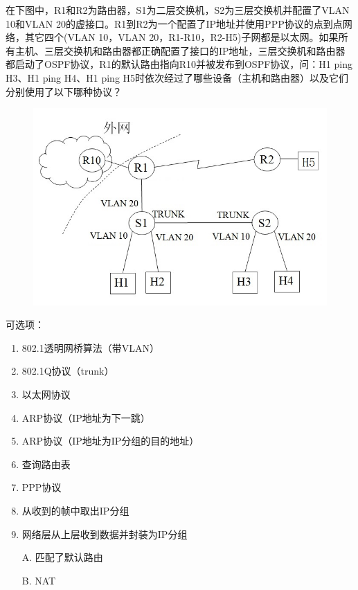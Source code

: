 \begin{example}[综合题]
	在下图中，R1和R2为路由器，S1为二层交换机，S2为三层交换机并配置了VLAN 10和VLAN 20的虚接口。R1到R2为一个配置了IP地址并使用PPP协议的点到点网络，其它四个(VLAN 10，VLAN 20，R1-R10，R2-H5)子网都是以太网。如果所有主机、三层交换机和路由器都正确配置了接口的IP地址，三层交换机和路由器都启动了OSPF协议，R1的默认路由指向R10并被发布到OSPF协议，问：H1 ping H3、H1 ping H4、H1 ping H5时依次经过了哪些设备（主机和路由器）以及它们分别使用了以下哪种协议？
	\begin{figure}[H]
		\centering
		\includegraphics[width=0.5\linewidth]{fig/route_all_example.jpg}
	\end{figure}
	可选项：
	\begin{enumerate}
\item 802.1透明网桥算法（带VLAN）
\item 802.1Q协议（trunk）
\item 以太网协议
\item ARP协议（IP地址为下一跳）
\item ARP协议（IP地址为IP分组的目的地址）
\item 查询路由表
\item PPP协议
\item 从收到的帧中取出IP分组
\item 网络层从上层收到数据并封装为IP分组
\item [A.] 匹配了默认路由
\item [B.] NAT
	\end{enumerate}
\end{example}
